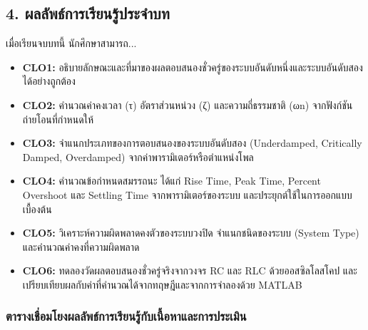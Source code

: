 \subsection{4. ผลลัพธ์การเรียนรู้ประจำบท}

เมื่อเรียนจบบทนี้ นักศึกษาสามารถ...

\begin{itemize}
    \item \textbf{CLO1:} อธิบายลักษณะและที่มาของผลตอบสนองชั่วครู่ของระบบอันดับหนึ่งและระบบอันดับสองได้อย่างถูกต้อง
    \item \textbf{CLO2:} คำนวณค่าคงเวลา (τ) อัตราส่วนหน่วง (ζ) และความถี่ธรรมชาติ (ωn) จากฟังก์ชันถ่ายโอนที่กำหนดให้
    \item \textbf{CLO3:} จำแนกประเภทของการตอบสนองของระบบอันดับสอง (Underdamped, Critically Damped, Overdamped) จากค่าพารามิเตอร์หรือตำแหน่งโพล
    \item \textbf{CLO4:} คำนวณข้อกำหนดสมรรถนะ ได้แก่ Rise Time, Peak Time, Percent Overshoot และ Settling Time จากพารามิเตอร์ของระบบ และประยุกต์ใช้ในการออกแบบเบื้องต้น
    \item \textbf{CLO5:} วิเคราะห์ความผิดพลาดคงตัวของระบบวงปิด จำแนกชนิดของระบบ (System Type) และคำนวณค่าคงที่ความผิดพลาด
    \item \textbf{CLO6:} ทดลองวัดผลตอบสนองชั่วครู่จริงจากวงจร RC และ RLC ด้วยออสซิลโลสโคป และเปรียบเทียบผลกับค่าที่คำนวณได้จากทฤษฎีและจากการจำลองด้วย MATLAB
\end{itemize}

\subsubsection{ตารางเชื่อมโยงผลลัพธ์การเรียนรู้กับเนื้อหาและการประเมิน}

